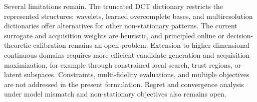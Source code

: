 \documentclass[lettersize,journal]{IEEEtran}
\begin{document}
Several limitations remain. The truncated DCT dictionary restricts the represented structures; wavelets, learned overcomplete bases, and multiresolution dictionaries offer alternatives for other non-stationary patterns. The current surrogate and acquisition weights are heuristic, and principled online or decision-theoretic calibration remains an open problem. Extension to higher-dimensional continuous domains requires more efficient candidate generation and acquisition maximization, for example through constrained local search, trust regions, or latent subspaces. Constraints, multi-fidelity evaluations, and multiple objectives are not addressed in the present formulation. Regret and convergence analysis under model mismatch and non-stationary objectives also remains open.



\end{document}
